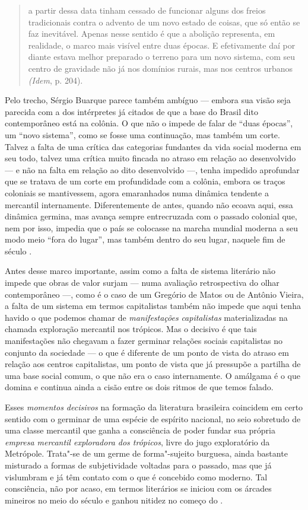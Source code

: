 \begin{quote}
a partir dessa data tinham cessado de funcionar alguns dos freios
tradicionais contra o advento de um novo estado de coisas, que só então
se faz inevitável. Apenas nesse sentido é que a abolição representa, em
realidade, o marco mais visível entre duas épocas. E efetivamente daí
por diante estava melhor preparado o terreno para um novo sistema, com
seu centro de gravidade não já nos domínios rurais, mas nos centros
urbanos \emph{(Idem}, p. 204).
\end{quote}

Pelo trecho, Sérgio Buarque parece também ambíguo --- embora sua visão
seja parecida com a dos intérpretes já citados de que a base do Brasil
dito contemporâneo está na colônia. O que não o impede de falar de
``duas épocas'', um ``novo sistema'', como se fosse uma continuação, mas
também um corte. Talvez a falta de uma crítica das categorias fundantes
da vida social moderna em seu todo, talvez uma crítica muito fincada no
atraso em relação ao desenvolvido --- e não na falta em relação ao dito
desenvolvido ---, tenha impedido aprofundar que se tratava de um corte em
profundidade com a colônia, embora os traços coloniais se mantivessem,
agora emaranhados numa dinâmica tendente a mercantil internamente.
Diferentemente de antes, quando não ecoava aqui, essa dinâmica germina,
mas avança sempre entrecruzada com o passado colonial que, nem por isso,
impedia que o país se colocasse na marcha mundial moderna a seu modo
meio ``fora do lugar'', mas também dentro do seu lugar, naquele fim de
século .

Antes desse marco importante, assim como a falta de sistema literário
não impede que obras de valor surjam --- numa avaliação retrospectiva do
olhar contemporâneo ---, como é o caso de um Gregório de Matos ou de
Antônio Vieira, a falta de um sistema em termos capitalistas também não
impede que aqui tenha havido o que podemos chamar de
\emph{manifestações} \emph{capitalistas} materializadas na chamada
exploração mercantil nos trópicos. Mas o decisivo é que tais
manifestações não chegavam a fazer germinar relações sociais
capitalistas no conjunto da sociedade --- o que é diferente de um ponto
de vista do atraso em relação aos centros capitalistas, um ponto de
vista que já pressupõe a partilha de uma base social comum, o que não
era o caso internamente. O amálgama é o que domina e continua ainda a
cisão entre os dois ritmos de que temos falado.

Esses \emph{momentos decisivos} na formação da literatura brasileira
coincidem em certo sentido com o germinar de uma espécie de espírito
nacional, no seio sobretudo de uma classe mercantil que ganha a
consciência de poder fundar sua própria \emph{empresa mercantil
exploradora dos trópicos}, livre do jugo exploratório da Metrópole.
Trata"-se de um germe de forma"-sujeito burguesa, ainda bastante misturado
a formas de subjetividade voltadas para o passado, mas que já vislumbram
e já têm contato com o que é concebido como moderno. Tal consciência,
não por acaso, em termos literários se iniciou com os árcades mineiros
no meio do século  e ganhou nitidez no começo do .

